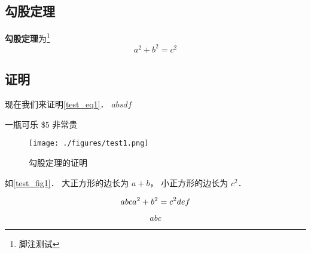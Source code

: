 

\subsection{勾股定理}
\textbf{勾股定理}为\footnote{脚注测试}
\begin{equation}\label{test_eq1}
a^2 + b^2 = c^2
\end{equation}

\subsection{证明}
现在我们来证明\autoref{test_eq1}． $absdf$

一瓶可乐 \$5 非常贵

\begin{figure}[ht]
\centering
\texttt{[image: ./figures/test1.png]}
\caption{勾股定理的证明} \label{test_fig1}
\end{figure}

如\autoref{test_fig1}． 大正方形的边长为 $a + b$， 小正方形的边长为 $c^2$． 

\begin{equation}
abc\\
a^2 + b^2 = c^2\\
def
\end{equation}

\begin{equation}
abc
\end{equation}

